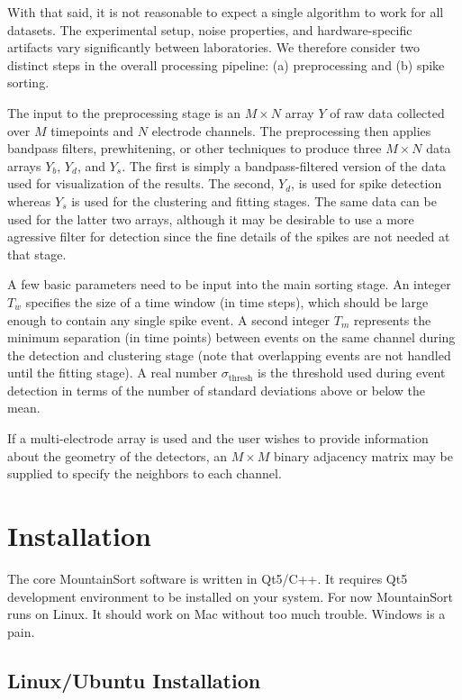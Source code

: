 \documentclass[hidelinks,10pt]{article}
\begin{document}
With that said, it is not reasonable to expect a single algorithm to work for all datasets. The experimental setup, noise properties, and hardware-specific artifacts vary significantly between laboratories. We therefore consider two distinct steps in the overall processing pipeline: (a) preprocessing and (b) spike sorting. 

The input to the preprocessing stage is an $M\times N$ array $Y$ of raw data collected over $M$ timepoints and $N$ electrode channels. The preprocessing then applies bandpass filters, prewhitening, or other techniques to produce three $M\times N$ data arrays $Y_b$, $Y_d$, and $Y_s$. The first is simply a bandpass-filtered version of the data used for visualization of the results. The second, $Y_d$, is used for spike detection whereas $Y_s$ is used for the clustering and fitting stages. The same data can be used for the latter two arrays, although it may be desirable to use a more agressive filter for detection since the fine details of the spikes are not needed at that stage.

A few basic parameters need to be input into the main sorting stage. An integer $T_w$ specifies the size of a time window (in time steps), which should be large enough to contain any single spike event. A second integer $T_m$ represents the minimum separation (in time points) between events on the same channel during the detection and clustering stage (note that overlapping events are not handled until the fitting stage). A real number $\sigma_\text{thresh}$ is the threshold used during event detection in terms of the number of standard deviations above or below the mean.

If a multi-electrode array is used and the user wishes to provide information about the geometry of the detectors, an $M\times M$ binary adjacency matrix may be supplied to specify the neighbors to each channel.

\section {Installation}


The core MountainSort software is written in Qt5/C++. It requires Qt5 development environment to be installed on your system. For now MountainSort runs on Linux. It should work on Mac without too much trouble. Windows is a pain.

\subsection {Linux/Ubuntu Installation}
\end{document}
